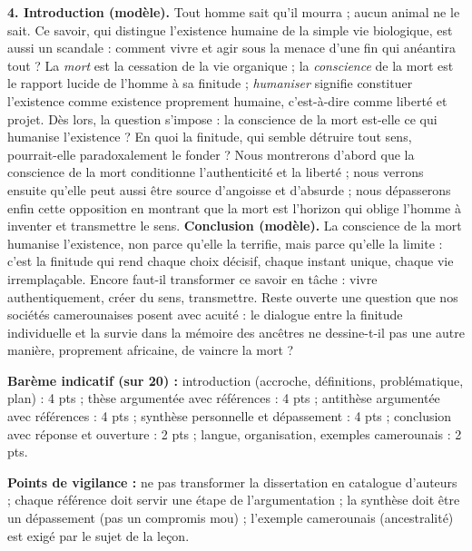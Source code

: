 \documentclass[11pt]{article}
\begin{document}
\begin{corrige}
\begin{itemize}
\end{itemize}
\textbf{4. Introduction (modèle).} Tout homme sait qu'il mourra ; aucun animal ne le sait. Ce savoir, qui distingue l'existence humaine de la simple vie biologique, est aussi un scandale : comment vivre et agir sous la menace d'une fin qui anéantira tout ? La \emph{mort} est la cessation de la vie organique ; la \emph{conscience} de la mort est le rapport lucide de l'homme à sa finitude ; \emph{humaniser} signifie constituer l'existence comme existence proprement humaine, c'est-à-dire comme liberté et projet. Dès lors, la question s'impose : la conscience de la mort est-elle ce qui humanise l'existence ? En quoi la finitude, qui semble détruire tout sens, pourrait-elle paradoxalement le fonder ? Nous montrerons d'abord que la conscience de la mort conditionne l'authenticité et la liberté ; nous verrons ensuite qu'elle peut aussi être source d'angoisse et d'absurde ; nous dépasserons enfin cette opposition en montrant que la mort est l'horizon qui oblige l'homme à inventer et transmettre le sens.
\textbf{Conclusion (modèle).} La conscience de la mort humanise l'existence, non parce qu'elle la terrifie, mais parce qu'elle la limite : c'est la finitude qui rend chaque choix décisif, chaque instant unique, chaque vie irremplaçable. Encore faut-il transformer ce savoir en tâche : vivre authentiquement, créer du sens, transmettre. Reste ouverte une question que nos sociétés camerounaises posent avec acuité : le dialogue entre la finitude individuelle et la survie dans la mémoire des ancêtres ne dessine-t-il pas une autre manière, proprement africaine, de vaincre la mort ?

\textbf{Barème indicatif (sur 20) :} introduction (accroche, définitions, problématique, plan) : 4 pts ; thèse argumentée avec références : 4 pts ; antithèse argumentée avec références : 4 pts ; synthèse personnelle et dépassement : 4 pts ; conclusion avec réponse et ouverture : 2 pts ; langue, organisation, exemples camerounais : 2 pts.

\textbf{Points de vigilance :} ne pas transformer la dissertation en catalogue d'auteurs ; chaque référence doit servir une étape de l'argumentation ; la synthèse doit être un dépassement (pas un compromis mou) ; l'exemple camerounais (ancestralité) est exigé par le sujet de la leçon.
\end{corrige}
\end{document}
